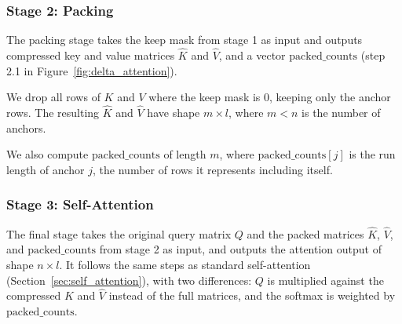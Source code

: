 \subsubsection{Stage 2: Packing}
\label{sec:packing}

The packing stage takes the keep mask from stage 1 as input and outputs compressed key and value matrices $\hat{K}$ and $\hat{V}$, and a vector $\text{packed\_counts}$ (step 2.1 in Figure~\ref{fig:delta_attention}).

We drop all rows of $K$ and $V$ where the keep mask is 0, keeping only the anchor rows. The resulting $\hat{K}$ and $\hat{V}$ have shape $m \times l$, where $m < n$ is the number of anchors.

We also compute $\text{packed\_counts}$ of length $m$, where $\text{packed\_counts}[j]$ is the run length of anchor $j$, the number of rows it represents including itself.

\subsubsection{Stage 3: Self-Attention}
\label{sec:self_attention_compressed}

The final stage takes the original query matrix $Q$ and the packed matrices $\hat{K}$, $\hat{V}$, and $\text{packed\_counts}$ from stage 2 as input, and outputs the attention output of shape $n \times l$. It follows the same steps as standard self-attention (Section~\ref{sec:self_attention}), with two differences: $Q$ is multiplied against the compressed $\hat{K}$ and $\hat{V}$ instead of the full matrices, and the softmax is weighted by $\text{packed\_counts}$.


